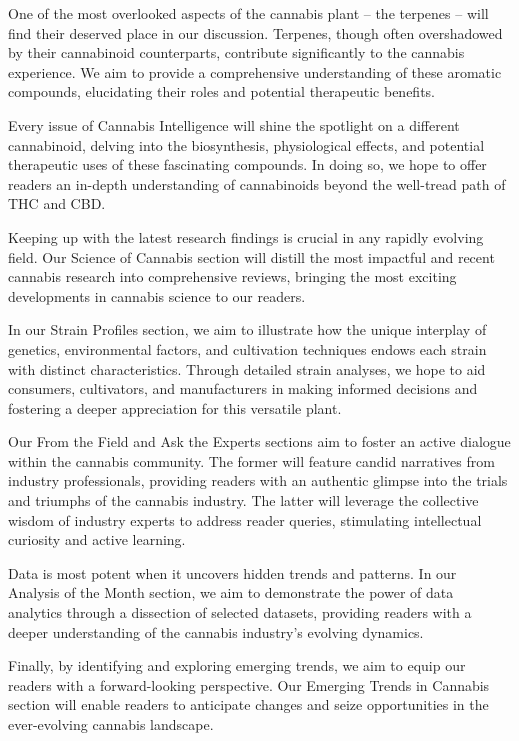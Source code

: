\documentclass[../article.tex, 12pt]{subfiles}
\begin{document}
\begin{multicols*}{2}
One of the most overlooked aspects of the cannabis plant – the terpenes – will find their deserved place in our discussion. Terpenes, though often overshadowed by their cannabinoid counterparts, contribute significantly to the cannabis experience. We aim to provide a comprehensive understanding of these aromatic compounds, elucidating their roles and potential therapeutic benefits.

Every issue of Cannabis Intelligence will shine the spotlight on a different cannabinoid, delving into the biosynthesis, physiological effects, and potential therapeutic uses of these fascinating compounds. In doing so, we hope to offer readers an in-depth understanding of cannabinoids beyond the well-tread path of THC and CBD.

Keeping up with the latest research findings is crucial in any rapidly evolving field. Our Science of Cannabis section will distill the most impactful and recent cannabis research into comprehensive reviews, bringing the most exciting developments in cannabis science to our readers.

In our Strain Profiles section, we aim to illustrate how the unique interplay of genetics, environmental factors, and cultivation techniques endows each strain with distinct characteristics. Through detailed strain analyses, we hope to aid consumers, cultivators, and manufacturers in making informed decisions and fostering a deeper appreciation for this versatile plant.

Our From the Field and Ask the Experts sections aim to foster an active dialogue within the cannabis community. The former will feature candid narratives from industry professionals, providing readers with an authentic glimpse into the trials and triumphs of the cannabis industry. The latter will leverage the collective wisdom of industry experts to address reader queries, stimulating intellectual curiosity and active learning.

Data is most potent when it uncovers hidden trends and patterns. In our Analysis of the Month section, we aim to demonstrate the power of data analytics through a dissection of selected datasets, providing readers with a deeper understanding of the cannabis industry's evolving dynamics.

Finally, by identifying and exploring emerging trends, we aim to equip our readers with a forward-looking perspective. Our Emerging Trends in Cannabis section will enable readers to anticipate changes and seize opportunities in the ever-evolving cannabis landscape.


\end{multicols*}
\end{document}
